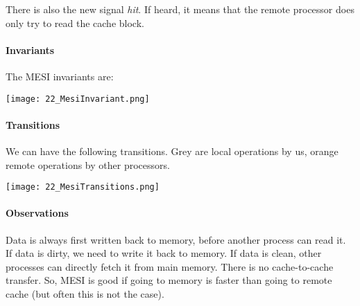 There is also the new signal \textit{hit}. If heard, it means that the remote processor does only try to read the cache block.

\paragraph{Invariants}
The MESI invariants are:

\texttt{[image: 22\_MesiInvariant.png]}

\paragraph{Transitions}
We can have the following transitions. Grey are local operations by us, orange remote operations by other processors.

\texttt{[image: 22\_MesiTransitions.png]}

\paragraph{Observations}
Data is always first written back to memory, before another process can read it. If data is dirty, we need to write it back to memory. If data is clean, other processes can directly fetch it from main memory. There is no cache-to-cache transfer. So, MESI is good if going to memory is faster than going to remote cache (but often this is not the case).
